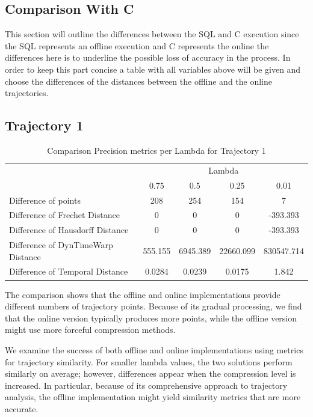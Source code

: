 \subsection{Comparison With C}
This section will outline the differences between the SQL and C execution since the SQL represents an offline execution and C represents the online the differences here is to underline the possible loss of accuracy in the process. In order to keep this part concise a table with all variables above will be given and choose the differences of the distances between the offline and the online trajectories.

\subsection{Trajectory 1}

\begin{table}[htbp]
    \centering
    \label{tab:precision_metrics_c}
    \begin{tabular}{@{}lcccc@{}}
        \toprule
        & \multicolumn{4}{c}{Lambda} \\
        \cmidrule{2-5}
        & 0.75       & 0.5        & 0.25       & 0.01       \\
        \midrule
        Difference of points           & 208 & 254 & 154 & 7 \\
        Difference of Frechet Distance              & 0 & 0 & 0 & -393.393 \\
        Difference of Hausdorff Distance             & 0 & 0 & 0 & -393.393 \\
        Difference of DynTimeWarp Distance            & 555.155 & 6945.389 & 22660.099 & 830547.714\\
        Difference of Temporal Distance            & 0.0284 & 0.0239 & 0.0175 & 1.842\\
        \bottomrule
    \end{tabular}
    \caption{Comparison Precision metrics per Lambda for Trajectory 1 }
\end{table}

The comparison shows that the offline and online implementations provide different numbers of trajectory points. Because of its gradual processing, we find that the online version typically produces more points, while the offline version might use more forceful compression methods.

We examine the success of both offline and online implementations using metrics for trajectory similarity. For smaller lambda values, the two solutions perform similarly on average; however, differences appear when the compression level is increased. In particular, because of its comprehensive approach to trajectory analysis, the offline implementation might yield similarity metrics that are more accurate.

